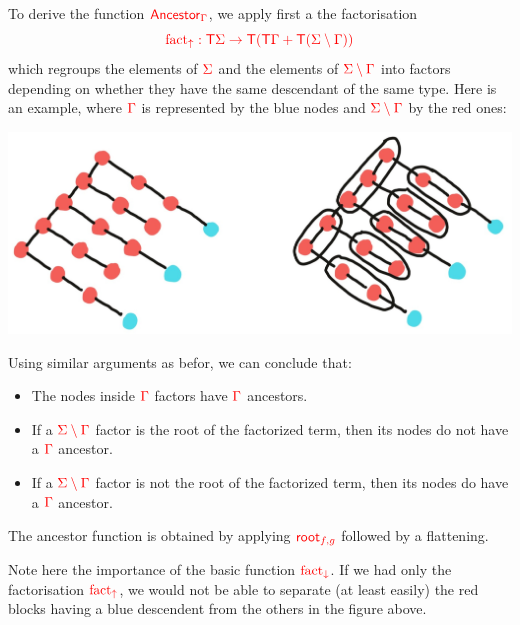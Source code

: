 \begin{example}
To derive the function ${\color{red}{\mathsf{Ancestor}_\Gamma}}$, we apply first a the factorisation
$${\color{red}{{\color{red}{\mathrm{fact_{\uparrow}}}}: {\color{red}{\mathsf T}}{\color{red}{\Sigma}}\to {\color{red}{\mathsf T}}({\color{red}{\mathsf T}}{\color{red}{\Gamma}}+{\color{red}{\mathsf T}}({\color{red}{\Sigma}}\setminus{\color{red}{\Gamma}}))}}$$ which regroups the elements of ${\color{red}{\Sigma}}$ and the elements of ${\color{red}{{\color{red}{\Sigma}}\setminus{\color{red}{\Gamma}}}}$ into factors depending on whether they have the same descendant of the same type. Here is an example,  where ${\color{red}{\Gamma}}$ is represented by the blue nodes and ${\color{red}{{\color{red}{\Sigma}}\setminus {\color{red}{\Gamma}}}}$ by the red ones:
\begin{center}
\includegraphics[scale=.15]{MyPic7.jpg}
\end{center}
Using similar arguments as befor, we can conclude that:
\begin{itemize}
\item The nodes inside ${\color{red}{\Gamma}}$ factors have ${\color{red}{\Gamma}}$ ancestors.  
\item If a ${\color{red}{{\color{red}{\Sigma}}\setminus{\color{red}{\Gamma}}}}$ factor is the root of the factorized term, then its nodes do not have a ${\color{red}{\Gamma}}$ ancestor.
\item   If a ${\color{red}{{\color{red}{\Sigma}}\setminus{\color{red}{\Gamma}}}}$ factor is not the root of the factorized term, then its nodes do have a ${\color{red}{\Gamma}}$ ancestor.
\end{itemize}
The ancestor function is obtained by applying ${\color{red}{\mathsf{root}_{f,g}}}$ followed by a flattening.

Note here the importance of the basic function ${\color{red}{\mathrm{fact_{\downarrow}}}}$. If we had only the factorisation ${\color{red}{\mathrm{fact_{\uparrow}}}}$, we would not be able to separate (at least easily) the red blocks having a blue descendent from the others in the figure above.  
\end{example}
